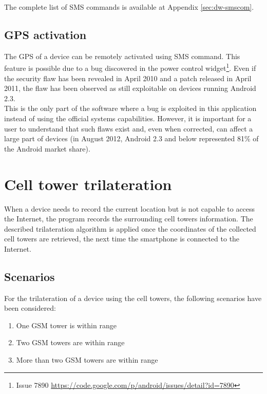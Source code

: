 The complete list of SMS commands is available at Appendix \ref{sec:dw-smscom}.

\subsection{GPS activation}
\label{sec:dw-gps-bug}

The GPS of a device can be remotely activated using SMS command.
This feature is possible due to a bug discovered in the power control widget\footnote{Issue 7890 \url{https://code.google.com/p/android/issues/detail?id=7890}}.
Even if the security flaw has been revealed in April 2010 and a patch released in April 2011, the flaw has been observed as still exploitable on devices running Android 2.3.\\

This is the only part of the software where a bug is exploited in this application instead of using the official systems capabilities.
However, it is important for a user to understand that such flaws exist and, even when corrected, can affect a large part of devices (in August 2012, Android 2.3 and below represented 81\% of the Android market share).


\section{Cell tower trilateration}

\label{sec:dw-cell-triangu}

When a device needs to record the current location but is not capable to access the Internet, the program records the surrounding cell towers information.
The described trilateration algorithm is applied once the coordinates of the collected cell towers are retrieved, the next time the smartphone is connected to the Internet.

\subsection{Scenarios}

For the trilateration of a device using the cell towers, the following scenarios have been considered:

\begin{enumerate}
\item One GSM tower is within range
\item Two GSM towers are within range
\item More than two GSM towers are within range
\end{enumerate}


